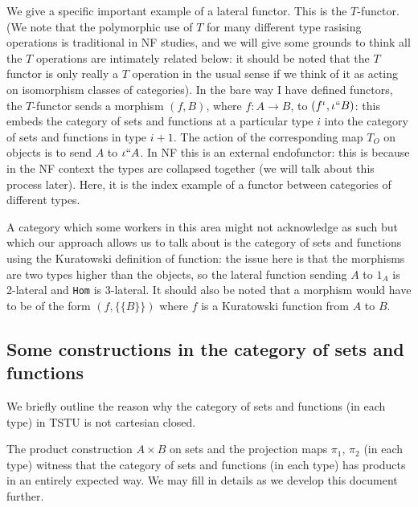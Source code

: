 \documentclass[12pt]{article}
\begin{document}
We give a specific important example of a lateral functor.  This is the $T$-functor.  (We note that the polymorphic use of $T$ for many different type rasising operations is traditional in NF studies, and we will give some grounds to think all the $T$ operations are intimately related below:  it should be noted that the $T$ functor is only really a $T$ operation in the usual sense if we think of it as acting on isomorphism classes of categories).  In the bare way I have defined functors, the $T$-functor sends a morphism $(f,B)$, where $f:A \rightarrow B$, to $(f^{\iota},\iota``B)$:  this embeds the category of sets and functions at a particular type $i$ into the category of sets and functions in type $i+1$.  The action of the corresponding map $T_O$ on objects is to send $A$ to $\iota``A$.  In NF this is an external endofunctor:  this is because in the NF context the types are collapsed together (we will talk about this process later).  Here, it is the index example of a functor between categories of different types.

A category which some workers in this area might not acknowledge as such but which our approach allows us to talk about is the category of sets and functions using the Kuratowski definition of function:  the issue here is that the morphisms are two types higher than the objects, so the lateral function sending $A$ to $1_A$ is 2-lateral and {\tt Hom} is 3-lateral.  It should also be noted that a morphism would have to be of the form $(f,\{\{B\}\})$ where $f$ is a Kuratowski function from $A$ to $B$.

\subsection{Some constructions in the category of sets and functions}

We briefly outline the reason why the category of sets and functions (in each type) in TSTU is not cartesian closed.

The product construction $A \times B$ on sets and the projection maps $\pi_1$, $\pi_2$ (in each type) witness that the category of sets and functions (in each type) has products in an entirely expected way.  We may fill in details as we develop this document further.
\end{document}
